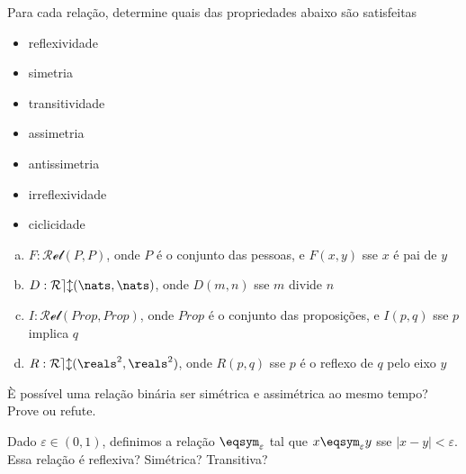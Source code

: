 \begin{exercise}
Para cada relação, determine quais das propriedades abaixo são satisfeitas
\begin{itemize}
    \item reflexividade
    \item simetria
    \item transitividade
    \item assimetria
    \item antissimetria
    \item irreflexividade
    \item ciclicidade
\end{itemize}

\begin{enumerate}[(a)]
    \item $F : \mathcal{Rel}(P,P)$, onde $P$ é o conjunto das pessoas, e $F(x,y)$ sse $x$ é pai de $y$
    \item $D : \mathcal{Rel}(\nats,\nats)$, onde $D(m,n)$ sse $m$ divide $n$
    \item $I : \mathcal{Rel}(Prop, Prop)$, onde $Prop$ é o conjunto das proposições, e $I(p,q)$ sse $p$ implica $q$
    \item $R : \mathcal{Rel}(\reals^2,\reals^2)$, onde $R(p,q)$ sse $p$ é o reflexo de $q$ pelo eixo $y$
\end{enumerate}
\end{exercise}

\begin{exercise}
È possível uma relação binária ser simétrica e assimétrica ao mesmo tempo? Prove ou refute.
\end{exercise}

\begin{exercise}
Dado $\varepsilon \in (0,1)$, definimos a relação $\eqsym_\varepsilon$ tal que $x \eqsym_\varepsilon y$ sse $|x-y| < \varepsilon$. Essa relação é reflexiva? Simétrica? Transitiva?
\end{exercise}
